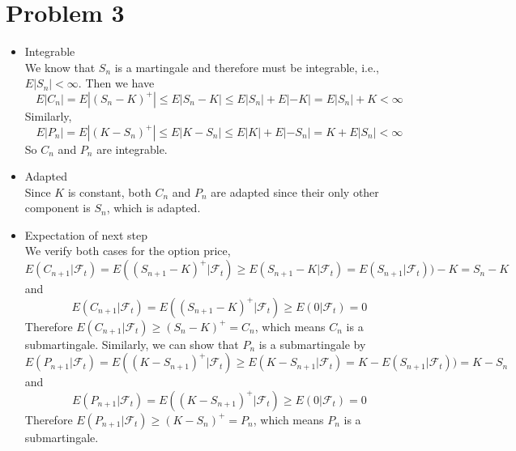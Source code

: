 \documentclass{article}
\begin{document}
\section*{Problem 3}
	\begin{itemize}
		\item Integrable \\
		We know that $S_n$ is a martingale and therefore must be integrable, i.e., $E|S_n| < \infty$. Then we have 
		\begin{equation}
			E|C_n| = E|(S_n-K)^{+}| \leq E|S_n-K| \leq E|S_n| + E\left|-K\right| = E|S_n| + K < \infty
		\end{equation}
		Similarly,
		\begin{equation}
			E|P_n| = E|(K-S_n)^{+}| \leq E|K-S_n| \leq E|K| + E|-S_n| = K + E|S_n| < \infty
		\end{equation}
		So $C_n$ and $P_n$ are integrable.
		\item Adapted \\
		Since $K$ is constant, both $C_n$ and $P_n$ are adapted since their only other component is $S_n$, which is adapted.
		\item Expectation of next step \\
		We verify both cases for the option price,
		\begin{equation}
			E(C_{n+1}|\mathcal{F}_t) = E((S_{n+1}-K)^{+}|\mathcal{F}_t) \geq E(S_{n+1}-K|\mathcal{F}_t) = E(S_{n+1}|\mathcal{F}_t)) -K = S_n -K
		\end{equation}
		and
		\begin{equation}
			E(C_{n+1}|\mathcal{F}_t) = E((S_{n+1}-K)^{+}|\mathcal{F}_t) \geq E(0|\mathcal{F}_t) = 0
		\end{equation}
		Therefore $E(C_{n+1}|\mathcal{F}_t) \geq (S_{n}-K)^{+} = C_n$, which means $C_n$ is a submartingale. Similarly, we can show that $P_n$ is a submartingale by
		\begin{equation}
			E(P_{n+1}|\mathcal{F}_t) = E((K-S_{n+1})^{+}|\mathcal{F}_t) \geq E(K-S_{n+1}|\mathcal{F}_t) = K - E(S_{n+1}|\mathcal{F}_t)) = K - S_n
		\end{equation}
		and
		\begin{equation}
			E(P_{n+1}|\mathcal{F}_t) = E((K-S_{n+1})^{+}|\mathcal{F}_t) \geq E(0|\mathcal{F}_t) = 0
		\end{equation}
		Therefore $E(P_{n+1}|\mathcal{F}_t) \geq (K-S_{n})^{+} = P_n$, which means $P_n$ is a submartingale.
	\end{itemize}
\end{document}
